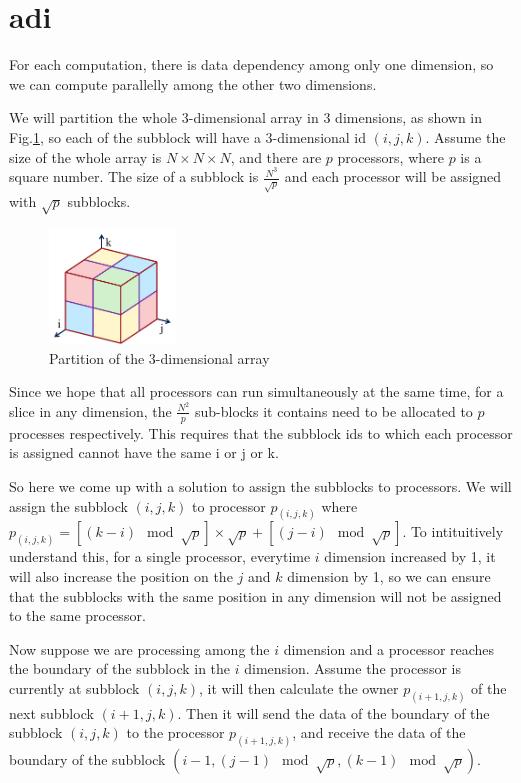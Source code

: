 \section*{adi}

For each computation, there is data dependency among only one dimension, so we can compute parallelly among the other two dimensions.

We will partition the whole 3-dimensional array in 3 dimensions, as shown in Fig.\ref*{fig:adi}, so each of the subblock will have a 3-dimensional id $(i,j,k)$. Assume the size of the whole array is $N \times N \times N$, and there are $p$ processors, where $p$ is a square number. The size of a subblock is $\frac{N^3}{\sqrt p}$ and each processor will be assigned with $\sqrt p$ subblocks.

\begin{figure}[h!]
    \centering
    \includegraphics[width=0.3\textwidth]{fig-adi.png}
    \caption{Partition of the 3-dimensional array}
    \label{fig:adi}
\end{figure}

Since we hope that all processors can run simultaneously at the same time, for a slice in any dimension, the $\frac{N^2}{p}$ sub-blocks it contains need to be allocated to $p$ processes respectively. This requires that the subblock ids to which each processor is assigned cannot have the same i or j or k.

So here we come up with a solution to assign the subblocks to processors. We will assign the subblock $(i,j,k)$ to processor $p_{(i,j,k)}$ where $p_{(i,j,k)} = [(k-i) \mod \sqrt p] \times \sqrt p + [(j - i) \mod \sqrt p]$. To intituitively understand this, for a single processor, everytime $i$ dimension increased by 1, it will also increase the position on the $j$ and $k$ dimension by 1, so we can ensure that the subblocks with the same position in any dimension will not be assigned to the same processor.

Now suppose we are processing among the $i$ dimension and a processor reaches the boundary of the subblock in the $i$ dimension. Assume the processor is currently at subblock $(i,j,k)$, it will then calculate the owner $p_{(i+1,j,k)}$ of the next subblock $(i+1,j,k)$. Then it will send the data of the boundary of the subblock $(i,j,k)$ to the processor $p_{(i+1,j,k)}$, and receive the data of the boundary of the subblock $\left(i-1,(j-1)\mod\sqrt p,(k-1)\mod\sqrt p\right)$.

